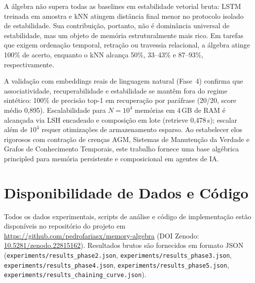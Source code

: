 \documentclass[11pt,a4paper]{article}
\theoremstyle{definition}
\begin{document}
A \'algebra n\~ao supera todas as baselines em estabilidade vetorial bruta: LSTM treinada em amostra e kNN atingem dist\^ancia final menor no protocolo isolado de estabilidade. Sua contribui\c{c}\~ao, portanto, n\~ao \'e domin\^ancia universal de estabilidade, mas um objeto de mem\'oria estruturalmente mais rico. Em tarefas que exigem ordena\c{c}\~ao temporal, retra\c{c}\~ao ou travessia relacional, a \'algebra atinge 100\% de acerto, enquanto o kNN alcan\c{c}a 50\%, 33--43\% e 87--93\%, respectivamente.

A valida\c{c}\~ao com embeddings reais de linguagem natural (Fase~4) confirma que associatividade, recuperabilidade e estabilidade se mant\^em fora do regime sint\'etico: 100\% de precis\~ao top-1 em recupera\c{c}\~ao por par\'afrase (20/20, score m\'edio 0,895). Escalabilidade para $N = 10^4$ mem\'orias em 4\,GB de RAM \'e alcan\c{c}ada via LSH encadeado e composi\c{c}\~ao em lote (retrieve 0,478\,s); escalar al\'em de $10^4$ requer otimiza\c{c}\~oes de armazenamento esparso. Ao estabelecer elos rigorosos com contra\c{c}\~ao de cren\c{c}as AGM, Sistemas de Manuten\c{c}\~ao da Verdade e Grafos de Conhecimento Temporais, este trabalho fornece uma base alg\'ebrica principled para mem\'oria persistente e composicional em agentes de IA.

\section*{Disponibilidade de Dados e C\'odigo}

Todos os dados experimentais, scripts de an\'alise e c\'odigo de implementa\c{c}\~ao est\~ao dispon\'iveis no reposit\'orio do projeto em \url{https://github.com/pedrofariasx/memory-algebra} (DOI Zenodo: \href{https://doi.org/10.5281/zenodo.22815162}{10.5281/zenodo.22815162}). Resultados brutos s\~ao fornecidos em formato JSON (\texttt{experiments/results\_phase2.json}, \texttt{experiments/results\_phase3.json}, \texttt{experiments/results\_phase4.json}, \texttt{experiments/results\_phase5.json}, \texttt{experiments/results\_chaining\_curve.json}).
\end{document}
